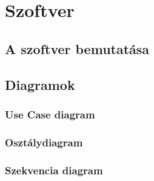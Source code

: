\chapter{Szoftver}

\section {A szoftver bemutatása}

\section {Diagramok}

\subsection{Use Case diagram}

\subsection{Osztálydiagram}
	
\subsection{Szekvencia diagram}
